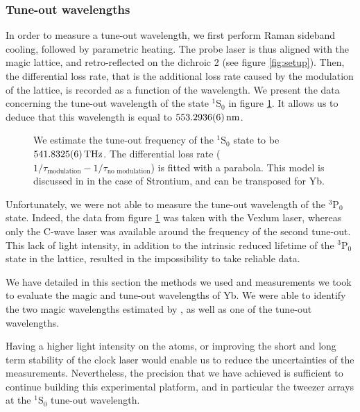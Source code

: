 \documentclass[11pt]{article}
\newenvironment{myblock}[1]{%
    \tcolorbox[%
    colback=color1,colframe=color1,%
    title=#1]}%
    {\endtcolorbox}
\numberwithin{equation}{section}
\numberwithin{figure}{section}
\begin{document}
\subsubsection{Tune-out wavelengths}
\label{sec:tune_out_wavelengths}

In order to measure a tune-out wavelength, we first perform Raman sideband cooling, followed by parametric heating. The probe laser is thus aligned with the magic lattice, and retro-reflected on the dichroic 2 (see figure \ref{fig:setup}). Then, the differential loss rate, that is the additional loss rate caused by the modulation of the lattice, is recorded as a function of the wavelength. 
We present the data concerning the tune-out wavelength of the state $^1$S$_0$ in figure \ref{fig:tune_out_results}. It allows us to deduce that this wavelength is equal to 
$\SI{553.2936\pm0.0006}{\nano\metre}$.

%
\begin{figure}[htb]
	\centering
	\small
    
	\caption{\small We estimate the tune-out frequency of the $^1$S$_0$ state to be $\SI{541.8325\pm0.0006}{\tera\hertz}$. The differential loss rate ($1/\tau_\text{modulation} - 1/\tau_\text{no modulation}$) is fitted with a parabola. This model is discussed in \cite{2020_heinz} in the case of Strontium, and can be transposed for Yb.}
    \label{fig:tune_out_results}
\end{figure}
%

Unfortunately, we were not able to measure the tune-out wavelength of the $^3$P$_0$ state. Indeed, the data from figure \ref{fig:tune_out_results} was taken with the Vexlum laser, whereas only the C-wave laser was available around the frequency of the second tune-out. This lack of light intensity, in addition to the intrinsic reduced lifetime of the $^3$P$_0$ state in the lattice, resulted in the impossibility to take reliable data.

\vspace{0.5cm}

\begin{myblock}{}
We have detailed in this section the methods we used and measurements we took to evaluate the magic and tune-out wavelengths of Yb. We were able to identify the two magic wavelengths estimated by \cite{2010_dzuba}, as well as one of the tune-out wavelengths. 

Having a higher light intensity on the atoms, or improving the short and long term stability of the clock laser would enable us to reduce the uncertainties of the measurements. Nevertheless, the precision that we have achieved is sufficient to continue building this experimental platform, and in particular the tweezer arrays at the $^1$S$_0$ tune-out wavelength.

\end{myblock}
\end{document}
